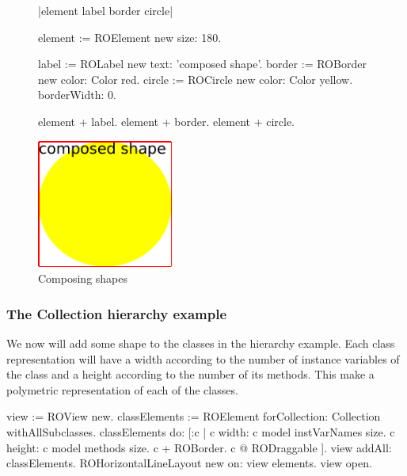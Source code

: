 \documentclass[a4paper,10pt,twoside]{book}
\begin{document}
\begin{figure}[H]
      \begin{minipage}[t]{0.5\textwidth}
      \vspace{0pt}
     \begin{code}

|element label border circle| 
    
element := ROElement new 
				size: 180.
				
label := ROLabel new 
				text: 'composed shape'.
border := ROBorder new 
				color: Color red. 
circle := ROCircle new 
				color: Color yellow.
				borderWidth: 0.
				
element + label.
element + border.
element + circle. \end{code}
   \end{minipage}
   \hfill
   \begin{minipage}[t]{0.4\textwidth}
      \vspace{0pt} \raggedright
       \centering
		\includegraphics[width=0.4\textwidth]{composed}
   \end{minipage}
\caption{Composing shapes}
\label{fig:composed}
\end{figure} 

\subsubsection*{The Collection hierarchy example}
We now will add some shape to the classes in the  hierarchy example. Each class representation will have a width according to the number of instance variables of the class and a height according to the number of its methods. This make a polymetric representation of each of the classes.

\begin{code}{}
view := ROView new.
classElements := ROElement forCollection: Collection withAllSubclasses.
classElements do: [:c | 
	c width: c model instVarNames size.
	c height: c model methods size.
	c + ROBorder. 
	c @ RODraggable ].
view addAll: classElements.
ROHorizontalLineLayout new on: view elements.
view open.
\end{code}
\end{document}
